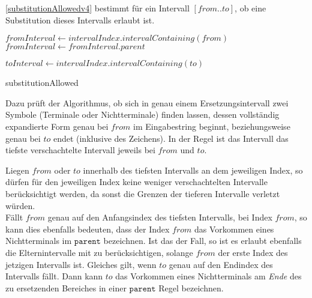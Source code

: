 \autoref{substitutionAllowedv4} bestimmt für ein Intervall $[from..to]$, ob eine Substitution dieses Intervalls erlaubt ist. 
\begin{algorithm}[t]
    $fromInterval \leftarrow intervalIndex.intervalContaining(from)$\;
     {
        $fromInterval \leftarrow fromInterval.parent$\;
    }

     {
        \KwRet{\KwFalse}
    }

    $toInterval \leftarrow intervalIndex.intervalContaining(to)$\;
    
    \caption{substitutionAllowed}
    \label{substitutionAllowedv4}
\end{algorithm}
Dazu prüft der Algorithmus, ob sich in genau einem Ersetzungsintervall zwei Symbole (Terminale oder Nichtterminale) finden lassen, dessen vollständig expandierte Form genau bei $from$ im Eingabestring beginnt, beziehungsweise genau bei $to$ endet (inklusive des Zeichens).
In der Regel ist das Intervall das tiefste verschachtelte Intervall jeweils bei $from$ und $to$. 

Liegen $from$ oder $to$ innerhalb des tiefsten Intervalls an dem jeweiligen Index, so dürfen für den jeweiligen Index keine weniger verschachtelten Intervalle berücksichtigt werden, da sonst die Grenzen der tieferen Intervalle verletzt würden.\\ 
Fällt $from$ genau auf den Anfangsindex des tiefsten Intervalls, bei Index $from$, so kann dies ebenfalls bedeuten, dass der Index $from$ das Vorkommen eines Nichtterminals im $\texttt{parent}$ bezeichnen. Ist das der Fall, so ist es erlaubt ebenfalls die Elternintervalle mit zu berücksichtigen, solange $from$ der erste Index des jetzigen Intervalls ist. Gleiches gilt, wenn $to$ genau auf den Endindex des Intervalls fällt. Dann kann $to$ das Vorkommen eines Nichtterminals am \emph{Ende} des zu ersetzenden Bereiches in einer $\texttt{parent}$ Regel bezeichnen.


